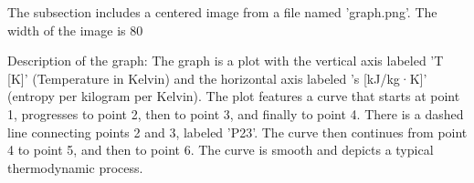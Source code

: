 The subsection includes a centered image from a file named 'graph.png'. The width of the image is 80%

Description of the graph: The graph is a plot with the vertical axis labeled 'T [K]' (Temperature in Kelvin) and the horizontal axis labeled 's [kJ/kg·K]' (entropy per kilogram per Kelvin). The plot features a curve that starts at point 1, progresses to point 2, then to point 3, and finally to point 4. There is a dashed line connecting points 2 and 3, labeled 'P23'. The curve then continues from point 4 to point 5, and then to point 6. The curve is smooth and depicts a typical thermodynamic process.
